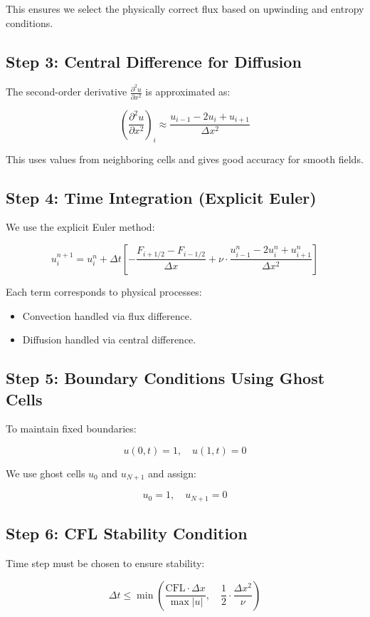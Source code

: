 \documentclass[12pt]{article}
\begin{document}
This ensures we select the physically correct flux based on upwinding and entropy conditions.

\subsection*{Step 3: Central Difference for Diffusion}
The second-order derivative \( \frac{\partial^2 u}{\partial x^2} \) is approximated as:

\[
\left( \frac{\partial^2 u}{\partial x^2} \right)_i \approx \frac{u_{i-1} - 2u_i + u_{i+1}}{\Delta x^2}
\]

This uses values from neighboring cells and gives good accuracy for smooth fields.

\subsection*{Step 4: Time Integration (Explicit Euler)}
We use the explicit Euler method:

\[
u_i^{n+1} = u_i^n + \Delta t \left[ -\frac{F_{i+1/2} - F_{i-1/2}}{\Delta x} + \nu \cdot \frac{u_{i-1}^n - 2u_i^n + u_{i+1}^n}{\Delta x^2} \right]
\]

Each term corresponds to physical processes:
\begin{itemize}
    \item Convection handled via flux difference.
    \item Diffusion handled via central difference.
\end{itemize}

\subsection*{Step 5: Boundary Conditions Using Ghost Cells}
To maintain fixed boundaries:

\[
u(0,t) = 1,\quad u(1,t) = 0
\]

We use ghost cells \( u_0 \) and \( u_{N+1} \) and assign:

\[
u_0 = 1,\quad u_{N+1} = 0
\]

\subsection*{Step 6: CFL Stability Condition}
Time step must be chosen to ensure stability:

\[
\Delta t \leq \min\left( \frac{\text{CFL} \cdot \Delta x}{\max |u|},\quad \frac{1}{2} \cdot \frac{\Delta x^2}{\nu} \right)
\]
\end{document}

